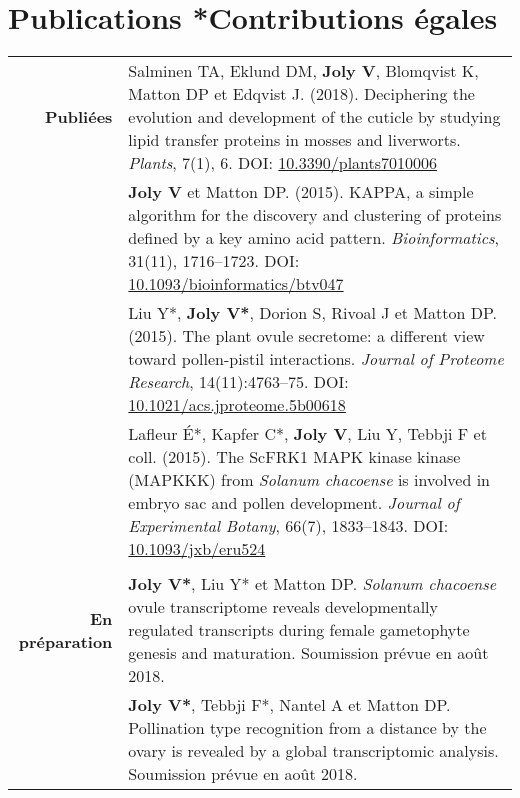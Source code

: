 \documentclass[letterpaper,10pt]{article}
\begin{document}
\section[Publications]{Publications \hfill \small{*Contributions égales}}
\begin{tabular}{r|p{13.8cm}}

\textbf{Publiées}

& Salminen TA, Eklund DM, \textbf{Joly V}, Blomqvist K, Matton DP
  et Edqvist J. (2018).
  Deciphering the evolution and development of the cuticle by studying lipid
  transfer proteins in mosses and liverworts.
  \emph{Plants}, 7(1), 6.
  DOI: \href{http://doi.org/10.3390/plants7010006}{10.3390/plants7010006}
  \vspace{3mm} \\

& \textbf{Joly V} et Matton DP. (2015).
  KAPPA, a simple algorithm for the discovery and clustering of proteins defined by
  a key amino acid pattern.
  \emph{Bioinformatics}, 31(11), 1716--1723.
  DOI: \href{http://doi.org/10.1093/bioinformatics/btv047}
  {10.1093/bioinformatics/btv047}
  \vspace{3mm} \\

& Liu Y*, \textbf{Joly V*}, Dorion S, Rivoal J et Matton DP. (2015).
  The plant ovule secretome: a different view toward pollen-pistil interactions.
  \emph{Journal of Proteome Research}, 14(11):4763--75.
  DOI: \href{http://doi.org/10.1021/acs.jproteome.5b00618}
  {10.1021/acs.jproteome.5b00618}
  \vspace{3mm} \\

& Lafleur É*, Kapfer C*, \textbf{Joly V}, Liu Y, Tebbji F et coll. (2015).
  The ScFRK1 MAPK kinase kinase (MAPKKK) from \emph{Solanum chacoense} is
  involved in embryo sac and pollen development.
  \emph{Journal of Experimental Botany}, 66(7), 1833--1843.
  DOI: \href{http://doi.org/10.1093/jxb/eru524}{10.1093/jxb/eru524}
  \\

\multicolumn{2}{c}{} \\

\textbf{En préparation}

& \textbf{Joly V*}, Liu Y* et Matton DP.
  \emph{Solanum chacoense} ovule transcriptome reveals developmentally regulated
  transcripts during female gametophyte genesis and maturation.
  Soumission prévue en août 2018.
  \vspace{3mm} \\

& \textbf{Joly V*}, Tebbji F*, Nantel A et Matton DP.
  Pollination type recognition from a distance by the ovary is revealed by a
  global transcriptomic analysis.
  Soumission prévue en août 2018.
  \\

\end{tabular}
\end{document}
